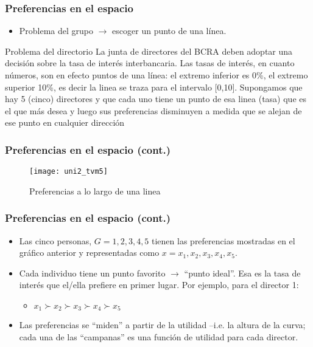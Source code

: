 \documentclass[14pt,aspectratio=169]{beamer}
\begin{document}
\begin{frame}\frametitle{Preferencias en el espacio}
\begin{itemize}\itemsep 10pt
\item Problema del grupo $\longrightarrow$ escoger un punto de una
  línea.
\end{itemize}
\begin{block}{Problema del directorio}
La junta de directores del BCRA deben adoptar una decisión sobre la
tasa de interés interbancaria. Las tasas de interés, en cuanto
números, son en efecto puntos de una línea: el extremo inferior es
0\%, el extremo superior 10\%, es decir la linea se traza para el
intervalo [0,10]. Supongamos que hay 5 (cinco) directores y que cada
uno tiene un punto de esa linea (tasa) que es el que más desea y luego
sus preferencias disminuyen a medida que se alejan de ese punto en
cualquier dirección
\end{block}
\end{frame}

\begin{frame}\frametitle{Preferencias en el espacio (cont.)}
 \begin{figure}[htbp]
    \centering
    \texttt{[image: uni2\_tvm5]}
    \caption{Preferencias a lo largo de una linea}
    \label{fig:1}
  \end{figure}
\end{frame}


\begin{frame}\frametitle{Preferencias en el espacio (cont.)}
\begin{itemize}\itemsep 10pt
\item Las cinco personas, $G={1,2,3,4,5}$ tienen las preferencias
  mostradas en el gráfico anterior y representadas como
  $x={x_1,x_2,x_3,x_4,x_5}$.
\item Cada individuo tiene un punto favorito $\longrightarrow$ ``punto
  ideal''. Esa es la tasa de interés que el/ella prefiere en primer
  lugar. Por ejemplo, para el director 1:
\begin{itemize}\itemsep 5pt
\item $x_1 \succ x_2 \succ x_3 \succ x_4 \succ x_5$
\end{itemize}
\item Las preferencias se ``miden'' a partir de la utilidad --i.e. la
  altura de la curva; cada una de las ``campanas'' es una función de
  utilidad para cada director.
\end{itemize}
\end{frame}
\end{document}
